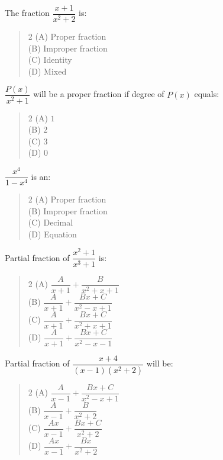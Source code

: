\documentclass[11pt,a4paper]{article}
\begin{document}
\begin{mcqlist}
\item The fraction $\dfrac{x+1}{x^2+2}$ is:
\begin{quote}\begin{multicols}{2}
\noindent (A) Proper fraction \\
(B) Improper fraction \\
(C) Identity \\
(D) Mixed
\end{multicols}\end{quote}

\item $\dfrac{P(x)}{x^2+1}$ will be a proper fraction if degree of $P(x)$ equals:
\begin{quote}\begin{multicols}{2}
\noindent (A) $1$ \\
(B) $2$ \\
(C) $3$ \\
(D) $0$
\end{multicols}\end{quote}

\item $\dfrac{x^4}{1-x^4}$ is an:
\begin{quote}\begin{multicols}{2}
\noindent (A) Proper fraction \\
(B) Improper fraction \\
(C) Decimal \\
(D) Equation
\end{multicols}\end{quote}

\item Partial fraction of $\dfrac{x^2+1}{x^3+1}$ is:
\begin{quote}\begin{multicols}{2}
\noindent (A) $\dfrac{A}{x+1}+\dfrac{B}{x^2+x+1}$ \\
(B) $\dfrac{A}{x+1}+\dfrac{Bx+C}{x^2-x+1}$ \\
(C) $\dfrac{A}{x+1}+\dfrac{Bx+C}{x^2+x+1}$ \\
(D) $\dfrac{A}{x+1}+\dfrac{Bx+C}{x^2-x-1}$
\end{multicols}\end{quote}

\item Partial fraction of $\dfrac{x+4}{(x-1)(x^2+2)}$ will be:
\begin{quote}\begin{multicols}{2}
\noindent (A) $\dfrac{A}{x-1}+\dfrac{Bx+C}{x^2-x+1}$ \\
(B) $\dfrac{A}{x-1}+\dfrac{B}{x^2+2}$ \\
(C) $\dfrac{Ax}{x-1}+\dfrac{Bx+C}{x^2+2}$ \\
(D) $\dfrac{Ax}{x-1}+\dfrac{Bx}{x^2+2}$
\end{multicols}\end{quote}


\end{mcqlist}
\end{document}

